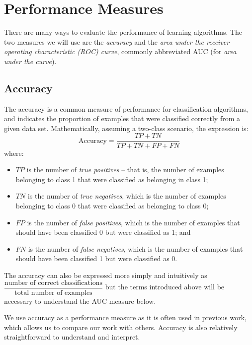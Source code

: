 \section{Performance Measures}
There are many ways to evaluate the performance of learning algorithms. The
two measures we will use are the \textit{accuracy} and the \textit{area under
the receiver operating characteristic (ROC) curve}, commonly abbreviated AUC
(for \textit{area under the curve}).

\subsection{Accuracy}
The accuracy is a common measure of performance for classification algorithms,
and indicates the proportion of examples that were classified correctly from
a given data set. Mathematically, assuming a two-class scenario, the expression
is:
\begin{equation*}
\mathrm{Accuracy} = \dfrac{TP + TN}{TP + TN + FP + FN}
\end{equation*}
where:
\begin{itemize}
  \item $TP$ is the number of \textit{true positives} -- that is, the number of
  examples belonging to class 1 that were classified as belonging in class 1;
  \item $TN$ is the number of \textit{true negatives}, which is the number of
  examples belonging to class 0 that were classified as belonging to class 0;
  \item $FP$ is the number of \textit{false positives}, which is the number of
  examples that should have been classified 0 but were classified as 1; and
  \item $FN$ is the number of \textit{false negatives}, which is the number of
  examples that should have been classified 1 but were classified as 0.
\end{itemize}

The accuracy can also be expressed more simply and intuitively as
$\dfrac{\text{number of correct classifications}}{\text{total number of examples}}$
but the terms introduced above will be necessary to understand the
AUC measure below.

We use accuracy as a performance measure as it is often used in previous work,
which allows us to compare our work with others. Accuracy is also relatively
straightforward to understand and interpret.

